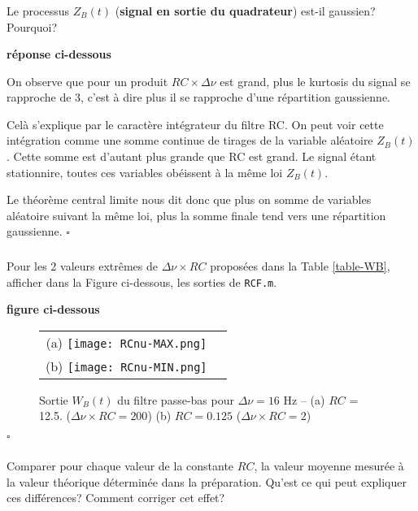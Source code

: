 \documentclass{article}
\newcommand{\debutrep}[1]{\color{blue}\begin{center} \hrulefill \textbf{ #1 } \hrulefill \end{center} }
\newcommand{\finrep}{\vspace*{5mm}\hfill $\square$\color{black}\vspace*{5mm}}
\begin{document}
\subsubsection{}
Le processus $Z_B(t)$ (\textbf{signal en sortie du quadrateur}) est-il gaussien? Pourquoi?

\debutrep{réponse ci-dessous}
On observe que pour un produit $RC\times\Delta\nu$ est grand, plus le kurtosis du signal se rapproche de 3, c'est à dire plus il se rapproche d'une répartition gaussienne.

Celà s'explique par le caractère intégrateur du filtre RC. On peut voir cette intégration comme une somme continue de tirages de la variable aléatoire $Z_B(t)$. Cette somme est d'autant plus grande que RC est grand.
Le signal étant stationnire, toutes ces variables obéissent à la même loi $Z_B(t)$.

Le théorème central limite nous dit donc que plus on somme de variables aléatoire suivant la même loi, plus la somme finale tend vers une répartition gaussienne.
\finrep

\subsubsection{}
Pour les 2 valeurs extrêmes de $\Delta\nu \times RC$ proposées dans la Table \ref{table-WB}, afficher dans la Figure ci-dessous, les sorties de {\tt RCF.m}.

\debutrep{figure ci-dessous}
\begin{figure}[H]
\begin{tabular}{cc}
(a) \texttt{[image: RCnu-MAX.png]} \\
(b) \texttt{[image: RCnu-MIN.png]} 
\\
\end{tabular}
 \caption{Sortie $W_B(t)$ du filtre passe-bas pour $\Delta\nu = 16$ Hz -- 
  (a) $RC$ = 12.5. ($\Delta\nu\times RC=200 $) (b) $RC = 0.125 $ ($\Delta\nu\times RC = 2 $) }
 \label{fig-Wb}
\end{figure}
\finrep


\subsubsection{}

Comparer pour chaque valeur de la constante $RC$, la valeur moyenne mesurée à la valeur théorique déterminée dans la préparation. Qu'est ce qui peut expliquer ces différences? Comment corriger cet effet?  \\
\end{document}
